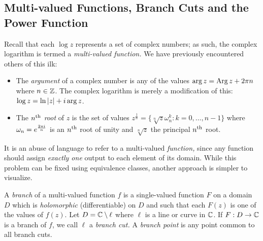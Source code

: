 \goodbreak



\subsection[Multi-valued Functions]{Multi-valued Functions, Branch Cuts and the Power Function}\label{sec:multivalued}%

Recall that each $\log z$ represents a set of complex numbers; as such, the complex logarithm is termed a \emph{multi-valued function.} We have previously encountered others of this ilk:
\begin{itemize}
  \item The \emph{argument} of a complex number is any of the values $\arg z=\operatorname{Arg} z+2\pi n$ where $n\in\mathbb{Z}$. The complex logarithm is merely a modification of this: $\log z=\ln\left| z\right|+i\arg z$.
  \item The \emph{$n\textsuperscript{th}$ root} of $z$ is the set of values $z^{\frac 1n}=\{\sqrt[n]{z}\omega_n^k:k=0,\ldots,n-1\}$ where $\omega_n=e^{\frac{2\pi i}{n}}$ is an $n\textsuperscript{th}$ root of unity and $\sqrt[n]{z}$ the principal $n\textsuperscript{th}$ root.
\end{itemize}
It is an abuse of language to refer to a multi-valued \emph{function,} since any function should assign \emph{exactly one} output to each element of its domain. While this problem can be fixed using equivalence classes, another approach is simpler to visualize.

\begin{defn}{}{}
	A \emph{branch} of a multi-valued function $f$ is a single-valued function $F$ on a domain $D$ which is \emph{holomorphic} (differentiable) on $D$ and such that each $F(z)$ is one of the values of $f(z)$.\smallbreak
	Let $D=\mathbb{C}\setminus\ell$ where $\ell$ is a line or curve in $\mathbb{C}$. If $F:D\to\mathbb{C}$ is a branch of $f$, we call $\ell$ a \emph{branch cut.} A \emph{branch point} is any point common to all branch cuts.
\end{defn}

